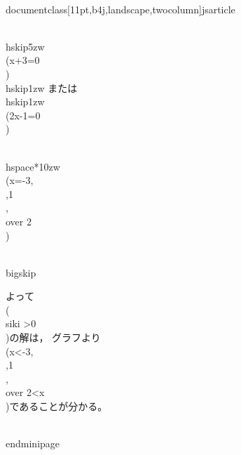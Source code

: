 \\documentclass[11pt,b4j,landscape,twocolumn]{jsarticle}
\begin{document}
\\hskip5zw \\(x+3=0\\)\\hskip1zw または\\hskip1zw \\(2x-1=0\\)

\\hspace*{10zw}\\(x=-3,~~{\\,1\\, \\over 2}\\)

\\bigskip

よって\\( \\siki >0\\)の解は，
グラフより\\(x<-3,~~{\\,1\\, \\over 2}<x\\)であることが分かる。

\\end{minipage}
\end{document}
